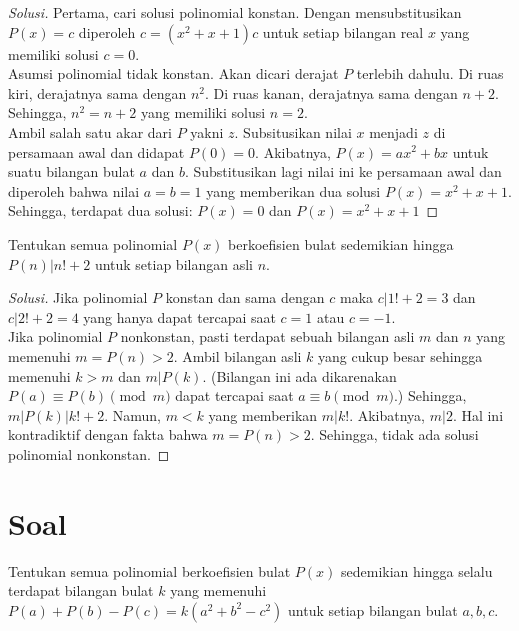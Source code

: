 \documentclass[11pt]{scrartcl}
\begin{document}
\begin{proof}[Solusi]
    Pertama, cari solusi polinomial konstan. Dengan mensubstitusikan $P(x) = c$ diperoleh $c = (x^2 + x + 1)c$ untuk setiap bilangan real $x$ yang memiliki solusi $c = 0$. \\
    Asumsi polinomial tidak konstan. Akan dicari derajat $P$ terlebih dahulu. Di ruas kiri, derajatnya sama dengan $n^2$. Di ruas kanan, derajatnya sama dengan $n + 2$. Sehingga, $n^2 = n + 2$ yang memiliki solusi $n = 2$. \\
    Ambil salah satu akar dari $P$ yakni $z$. Subsitusikan nilai $x$ menjadi $z$ di persamaan awal dan didapat $P(0) = 0$. Akibatnya, $P(x) = ax^2 + bx$ untuk suatu bilangan bulat $a$ dan $b$. Substitusikan lagi nilai ini ke persamaan awal dan diperoleh bahwa nilai $a = b = 1$ yang memberikan dua solusi $P(x) = x^2 + x + 1$. \\
    Sehingga, terdapat dua solusi: $P(x) = 0$ dan $P(x) = x^2 + x + 1$
\end{proof}

\begin{example}
    [Thailand MO 2020] Tentukan semua polinomial $P(x)$ berkoefisien bulat sedemikian hingga $P(n) | n! + 2$ untuk setiap bilangan asli $n$.
\end{example}

\begin{proof}[Solusi]
    Jika polinomial $P$ konstan dan sama dengan $c$ maka $c|1! + 2 = 3$ dan $c|2! + 2 = 4$ yang hanya dapat tercapai saat $c = 1$ atau $c = -1$. \\
    Jika polinomial $P$ nonkonstan, pasti terdapat sebuah bilangan asli  $m$ dan $n$ yang memenuhi $m = P(n) > 2$. Ambil bilangan asli $k$ yang cukup besar sehingga memenuhi $k > m$ dan $m|P(k)$. (Bilangan ini ada dikarenakan $P(a) \equiv P(b) \pmod{m}$ dapat tercapai saat $a \equiv b \pmod{m}$.) Sehingga, $m|P(k)|k! + 2$. Namun, $m < k$ yang memberikan $m|k!$. Akibatnya, $m|2$. Hal ini kontradiktif dengan fakta bahwa $m = P(n) > 2$. Sehingga, tidak ada solusi polinomial nonkonstan.
\end{proof}

\section{Soal}
\begin{problem}
    [Danube MO 2017] Tentukan semua polinomial berkoefisien bulat $P(x)$ sedemikian hingga selalu terdapat bilangan bulat $k$ yang memenuhi $P(a) + P(b) - P(c) = k(a^2 + b^2 - c^2)$ untuk setiap bilangan bulat $a, b, c$.
\end{problem}
\end{document}

